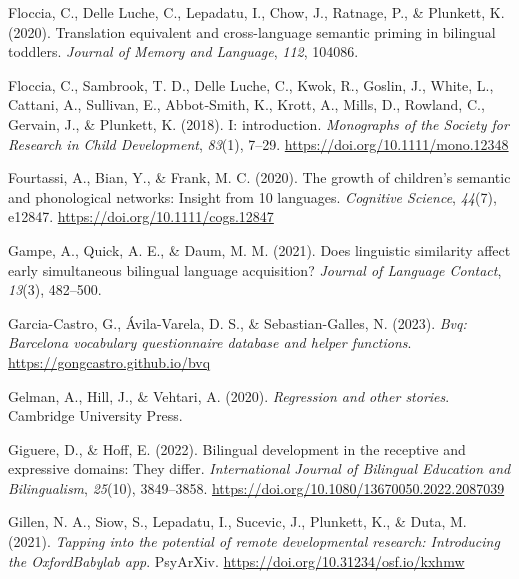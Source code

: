 \documentclass[
]{article}
\newlength{\cslhangindent}
\newlength{\cslentryspacingunit} %
\newenvironment{CSLReferences}[2] %
 {%
  \setlength{\parindent}{0pt}
  \ifodd #1
  \let\oldpar\par
  \def\par{\hangindent=\cslhangindent\oldpar}
  \fi
  \setlength{\parskip}{#2\cslentryspacingunit}
 }%
 {}
\begin{document}
\begin{CSLReferences}{1}{0}
\leavevmode{}%
Floccia, C., Delle Luche, C., Lepadatu, I., Chow, J., Ratnage, P., \&
Plunkett, K. (2020). Translation equivalent and cross-language semantic
priming in bilingual toddlers. \emph{Journal of Memory and Language},
\emph{112}, 104086.

\leavevmode{}%
Floccia, C., Sambrook, T. D., Delle Luche, C., Kwok, R., Goslin, J.,
White, L., Cattani, A., Sullivan, E., Abbot‐Smith, K., Krott, A., Mills,
D., Rowland, C., Gervain, J., \& Plunkett, K. (2018). I: introduction.
\emph{Monographs of the Society for Research in Child Development},
\emph{83}(1), 7--29. \url{https://doi.org/10.1111/mono.12348}

\leavevmode{}%
Fourtassi, A., Bian, Y., \& Frank, M. C. (2020). The growth of
children's semantic and phonological networks: Insight from 10
languages. \emph{Cognitive Science}, \emph{44}(7), e12847.
\url{https://doi.org/10.1111/cogs.12847}

\leavevmode{}%
Gampe, A., Quick, A. E., \& Daum, M. M. (2021). Does linguistic
similarity affect early simultaneous bilingual language acquisition?
\emph{Journal of Language Contact}, \emph{13}(3), 482--500.

\leavevmode{}%
Garcia-Castro, G., Ávila-Varela, D. S., \& Sebastian-Galles, N. (2023).
\emph{Bvq: Barcelona vocabulary questionnaire database and helper
functions}. \url{https://gongcastro.github.io/bvq}

\leavevmode{}%
Gelman, A., Hill, J., \& Vehtari, A. (2020). \emph{Regression and other
stories}. Cambridge University Press.

\leavevmode{}%
Giguere, D., \& Hoff, E. (2022). Bilingual development in the receptive
and expressive domains: They differ. \emph{International Journal of
Bilingual Education and Bilingualism}, \emph{25}(10), 3849--3858.
\url{https://doi.org/10.1080/13670050.2022.2087039}

\leavevmode{}%
Gillen, N. A., Siow, S., Lepadatu, I., Sucevic, J., Plunkett, K., \&
Duta, M. (2021). \emph{Tapping into the potential of remote
developmental research: Introducing the {OxfordBabylab} app}.
{PsyArXiv}. \url{https://doi.org/10.31234/osf.io/kxhmw}


\end{CSLReferences}
\end{document}
